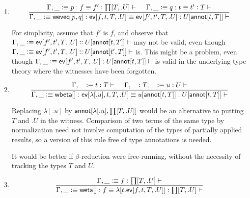 \documentclass[11pt]{article}
\newcommand{\eqd}{\equiv}
\newcommand{\spc}{{\,\,\,\,\,\,\,}}
\newcommand{\ccolon}[1]{\vcentcolon#1}
\newcommand{\ccheck}[1]{\vcentcolon#1}  %
\newcommand{\csynth}[1]{\vcentcolon\vcentcolon #1} %
\newcommand{\Type}{\mathop{\text{ \sc type}}}
\newcommand{\Okay}{\mathop{\text{ \sc okay}}}
\newcommand{\Context}{\vdash\Okay}
\renewcommand{\Context}{\vdash}
\newcommand{\ha}[2]{#1[#2]}
\newcommand{\weta}{{\sf weta}}
\newcommand{\annot}{{\sf annot}}
\newcommand{\haa}[2]{\ha\annot{#1,#2}}
\newcommand{\ev}{{\sf ev}}
\newcommand{\wbeta}{{\sf wbeta}}
\newcommand{\weveq}{{\sf weveq}}
\newcommand{\var}{\char`_}
\newcommand{\defn}{\vcentcolon\equiv}
\begin{document}
\begin{enumerate}
The annotation is present to ensure that the sentence $$\Gamma, \var \defn
U[\haa t T] \Type \Context$$ is checkable.

\item 
\[\frac{
   \Gamma, \var\defn p : f \eqd f' \ccolon{\ha\prod{T,.U}} \Context
   \spc 
   \Gamma, \var\defn q : t \eqd t' \ccolon{T} \Context
   }{
   \Gamma, \var\defn \ha\weveq{p,q} : \ha\ev{f,t,T,.U} \eqd \ha\ev{f',t',T,.U}
   \ccolon{U[\haa t T]} \Context
  }\]

For simplicity, assume that $f'$ is $f$, and observe that $\Gamma, \var\defn
\ha\ev{f',t',T,.U} \csynth{U[\haa t T]} \Context$ may not be valid, even though
$\Gamma,\var\defn \ha\ev{f',t',T,.U} \csynth{U[\haa {t'}{T}]} \Context$ is.  This
might be a problem, even though $\Gamma, \var\defn \ha\ev{f',t',T,.U} :
U[\haa{t}{T}] \Context$ is valid in the underlying type theory where the
witnesses have been forgotten.

\item 
\[\frac{
  \Gamma, \var\defn t \ccheck{T} \Context
  \spc
  \Gamma, \var \ccolon{T}, \var\defn u \ccheck{U} \Context
  }{
  \Gamma,\var\defn \ha\wbeta{} : \ha\ev{\ha\lambda{.u},t,T,.U} \eqd
  u[\haa{t}{T}] : U[\haa{t}{T}] \Context
}\]

Replacing $\ha\lambda{.u}$ by $\haa{\ha\lambda{.u}}{\ha\prod{T,.U}}$ would
be an alternative to putting $T$ and $.U$ in the witness.  Comparison of two
terms of the same type by normalization need not involve computation of the
types of partially applied results, so a version of this rule free of type
annotations is needed.

It would be better if $\beta$-reduction were free-running, without the
necessity of tracking the types $T$ and $U$.

\item 
\[
  \frac{\Gamma, \var\defn f \ccheck{\ha\prod{T,.U}}\Context}
       {\Gamma, \var\defn \ha\weta{} : f \eqd \ha\lambda{t.\ha\ev{f,t,T,.U}} : \ha\prod{T,.U}\Context}
\]

\end{enumerate}



\end{document}
